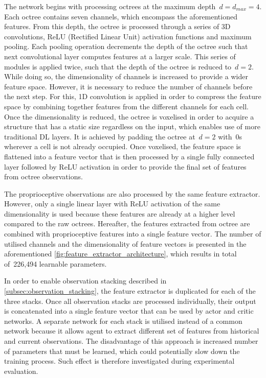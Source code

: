 The network begins with processing octrees at the maximum depth~\(d = d_{max} = 4\). Each octree contains seven channels, which encompass the aforementioned features. From this depth, the octree is processed through a series of 3D convolutions, ReLU (Rectified Linear Unit) activation functions and maximum pooling. Each pooling operation decrements the depth of the octree such that next convolutional layer computes features at a larger scale. This series of modules is applied twice, such that the depth of the octree is reduced to~\(d = 2\). While doing so, the dimensionality of channels is increased to provide a wider feature space. However, it is necessary to reduce the number of channels before the next step. For this, 1D convolution is applied in order to compress the feature space by combining together features from the different channels for each cell. Once the dimensionality is reduced, the octree is voxelised in order to acquire a structure that has a static size regardless on the input, which enables use of more traditional DL layers. It is achieved by padding the octree at~\(d = 2\) with~0s wherever a cell is not already occupied. Once voxelised, the feature space is flattened into a feature vector that is then processed by a single fully connected layer followed by ReLU activation in order to provide the final set of features from octree observations.

The proprioceptive observations are also processed by the same feature extractor. However, only a single linear layer with ReLU activation of the same dimensionality is used because these features are already at a higher level compared to the raw octrees. Hereafter, the features extracted from octree are combined with proprioceptive features into a single feature vector. The number of utilised channels and the dimensionality of feature vectors is presented in the aforementioned \autoref{fig:feature_extractor_architecture}, which results in total of~226,494 learnable parameters.

In order to enable observation stacking described in \autoref{subsec:observation_stacking}, the feature extractor is duplicated for each of the three stacks. Once all observation stacks are processed individually, their output is concatenated into a single feature vector that can be used by actor and critic networks. A separate network for each stack is utilised instead of a common network because it allows agent to extract different set of features from historical and current observations. The disadvantage of this approach is increased number of parameters that must be learned, which could potentially slow down the training process. Such effect is therefore investigated during experimental evaluation.


